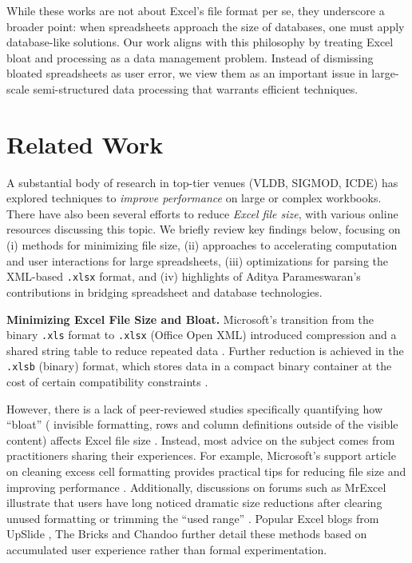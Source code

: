 \documentclass[conference]{IEEEtran}
\begin{document}
While these works are not about Excel's file format per se, they underscore a broader point: when spreadsheets approach the size of databases, one must apply database-like solutions. Our work aligns with this philosophy by treating Excel bloat and processing as a data management problem. Instead of dismissing bloated spreadsheets as user error, we view them as an important issue in large-scale semi-structured data processing that warrants efficient techniques.

 
\section{Related Work}
\label{sec:related-work}

A substantial body of research in top-tier venues (VLDB, SIGMOD, ICDE) has explored techniques to \emph{improve performance} on large or complex workbooks. There have also been several efforts to reduce \emph{Excel file size}, with various online resources discussing this topic. We briefly review key findings below, focusing on (i) methods for minimizing file size, (ii) approaches to accelerating computation and user interactions for large spreadsheets, (iii) optimizations for parsing the XML-based \texttt{.xlsx} format, and (iv) highlights of Aditya Parameswaran’s contributions in bridging spreadsheet and database technologies.

\textbf{Minimizing Excel File Size and Bloat.}
Microsoft’s transition from the binary \texttt{.xls} format to \texttt{.xlsx} (Office Open XML) introduced compression and a shared string table to reduce repeated data \cite{ecma2007openxml,Microsoft2007OpenXML}. Further reduction is achieved in the \texttt{.xlsb} (binary) format, which stores data in a compact binary container at the cost of certain compatibility constraints \cite{MicrosoftXLSB,Mack2018Scalability}.

However, there is a lack of peer-reviewed studies specifically quantifying how “bloat” (
  invisible formatting, rows and column definitions outside of the visible content) affects Excel file size \cite{lackOfStudies}. Instead, most advice on the subject comes from practitioners sharing their experiences. For example, Microsoft’s support article on cleaning excess cell formatting provides practical tips for reducing file size and improving performance \cite{MicrosoftXLSB}. Additionally, discussions on forums such as MrExcel illustrate that users have long noticed dramatic size reductions after clearing unused formatting or trimming the “used range” \cite{excelforum}. Popular Excel blogs from UpSlide \cite{upslide_blog}, The Bricks \cite{thebricks_blog} and Chandoo \cite{metadataBloat} further detail these methods based on accumulated user experience rather than formal experimentation.
\end{document}
